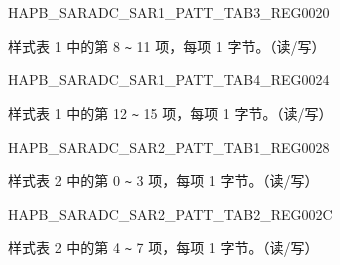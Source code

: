 \begin{register}{H}{APB\_SARADC\_SAR1\_PATT\_TAB3\_REG}{\hexprefix{}0020}\label{regdesc:APBSARADCSAR1PATTTAB3REG}
%
\regnewline%
\begin{regdesc}\begin{reglist}
\label{fielddesc:APBSARADCSAR1PATTTAB3}\item [APB\_SARADC\_SAR1\_PATT\_TAB3] 样式表 1 中的第 8 \verb+~+ 11 项，每项 1 字节。（读/写）
\end{reglist}\end{regdesc}
\end{register}


\begin{register}{H}{APB\_SARADC\_SAR1\_PATT\_TAB4\_REG}{\hexprefix{}0024}\label{regdesc:APBSARADCSAR1PATTTAB4REG}
%
\regnewline%
\begin{regdesc}\begin{reglist}
\label{fielddesc:APBSARADCSAR1PATTTAB4}\item [APB\_SARADC\_SAR1\_PATT\_TAB4] 样式表 1 中的第 12 \verb+~+ 15 项，每项 1 字节。（读/写）
\end{reglist}\end{regdesc}
\end{register}


\begin{register}{H}{APB\_SARADC\_SAR2\_PATT\_TAB1\_REG}{\hexprefix{}0028}\label{regdesc:APBSARADCSAR2PATTTAB1REG}
%
\regnewline%
\begin{regdesc}\begin{reglist}
\label{fielddesc:APBSARADCSAR2PATTTAB1}\item [APB\_SARADC\_SAR2\_PATT\_TAB1] 样式表 2 中的第 0 \verb+~+ 3 项，每项 1 字节。（读/写）
\end{reglist}\end{regdesc}
\end{register}


\begin{register}{H}{APB\_SARADC\_SAR2\_PATT\_TAB2\_REG}{\hexprefix{}002C}\label{regdesc:APBSARADCSAR2PATTTAB2REG}
%
\regnewline%
\begin{regdesc}\begin{reglist}
\label{fielddesc:APBSARADCSAR2PATTTAB2}\item [APB\_SARADC\_SAR2\_PATT\_TAB2] 样式表 2 中的第 4 \verb+~+ 7 项，每项 1 字节。（读/写）
\end{reglist}\end{regdesc}
\end{register}


